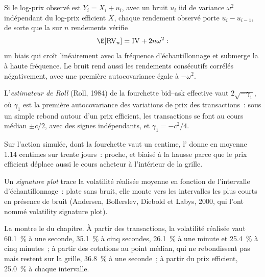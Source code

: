 Si le log-prix observé est $Y_i = X_i + u_i$, avec un bruit $u_i$ iid de variance $\omega^2$ indépendant du log-prix efficient $X$, chaque rendement observé porte $u_i - u_{i-1}$, de sorte que
la  sur $n$ rendements vérifie
\[
\E[\mathrm{RV}_n] = \mathrm{IV} + 2n\omega^2:
\]
un biais qui croît linéairement avec la fréquence d'échantillonnage et submerge la  à haute fréquence. Le bruit rend aussi les rendements consécutifs
corrélés négativement, avec une première autocovariance égale à $-\omega^2$.

\begin{definition}\label{def:qm:high-frequency-econometrics:roll}
L'\emph{estimateur de Roll} (Roll, 1984) de la fourchette bid--ask effective vaut $2\sqrt{-\gamma_1}$, où $\gamma_1$ est la première autocovariance des variations de prix
des transactions~: sous un simple rebond autour d'un prix efficient, les transactions se font au cours médian $\pm c/2$, avec des signes indépendants, et $\gamma_1 = -c^2/4$.
\end{definition}

Sur l'action simulée, dont la fourchette vaut un centime, l' donne en moyenne 1.14 centimes sur trente jours~: proche, et biaisé à la hausse parce que le prix efficient
déplace aussi le cours acheteur à l'intérieur de la grille.

\begin{definition}\label{def:qm:high-frequency-econometrics:signature}
Un \emph{signature plot} trace la volatilité réalisée moyenne en fonction de l'intervalle d'échantillonnage~: plate
sans bruit, elle monte vers les intervalles les plus courts en présence de bruit (Andersen, Bollerslev, Diebold et Labys, 2000, qui l'ont nommé volatility signature plot).
\end{definition}

La  montre le  du chapitre. À partir des transactions, la volatilité réalisée vaut 60.1~\% à une seconde, 35.1~\% à cinq
secondes, 26.1~\% à une minute et 25.4~\% à cinq minutes~; à partir des cotations au point médian, qui ne rebondissent pas mais restent sur la grille, 36.8~\% à une seconde~; à partir du
prix efficient, 25.0~\% à chaque intervalle.

